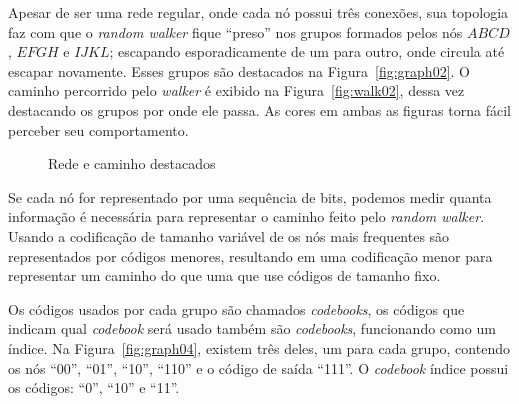 \documentclass[
  article,
  11pt,
  a4paper,
  english,
  brazil,
  sumario=tradicional]{abntex2}
\begin{document}
Apesar de ser uma rede regular, onde cada nó possui três conexões, sua topologia faz com que o \textit{random walker} fique \enquote{preso} nos grupos formados pelos nós $ABCD$, $EFGH$ e $IJKL$; escapando esporadicamente de um para outro, onde circula até escapar novamente. Esses grupos são destacados na Figura~\ref{fig:graph02}. O caminho percorrido pelo \textit{walker} é exibido na Figura~\ref{fig:walk02}, dessa vez destacando os grupos por onde ele passa. As cores em ambas as figuras torna fácil perceber seu comportamento.

\begin{figure}[ht]
  \centering
  \caption{Rede e caminho destacados}
\end{figure}

Se cada nó for representado por uma sequência de bits, podemos medir quanta informação é necessária para representar o caminho feito pelo \textit{random walker}. Usando a codificação de tamanho variável de   os nós mais frequentes são representados por códigos menores, resultando em uma codificação menor para representar um caminho do que uma que use códigos de tamanho fixo.

Os códigos usados por cada grupo são chamados \textit{codebooks}, os códigos que indicam qual \textit{codebook} será usado também são \textit{codebooks}, funcionando como um índice. Na Figura~\ref{fig:graph04}, existem três deles, um para cada grupo, contendo os nós \enquote{00}, \enquote{01}, \enquote{10}, \enquote{110} e o código de saída \enquote{111}. O \textit{codebook} índice possui os códigos: \enquote{0}, \enquote{10} e \enquote{11}.
\end{document}
